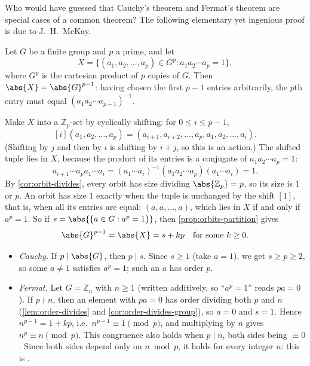 \begin{eg}\label{eg:mckay}
	Who would have guessed that Cauchy's theorem and Fermat's theorem are special cases of
	a common theorem? The following elementary yet ingenious proof is due to J.~H.~McKay.

	Let \(G\) be a finite group and \(p\) a prime, and let
	\[
		X = \{(a_1, a_2, \dots, a_p) \in G^p : a_1a_2\cdots a_p = 1\},
	\]
	where \(G^p\) is the cartesian product of \(p\) copies of \(G\). Then
	\(\abs{X} = \abs{G}^{p-1}\): having chosen the first \(p-1\) entries arbitrarily, the
	\(p\)th entry must equal \((a_1a_2\cdots a_{p-1})^{-1}\).

	Make \(X\) into a \(\mathbb Z_p\)-set by cyclically shifting: for
	\(0 \leq i \leq p-1\),
	\[
		[i](a_1, a_2, \dots, a_p) = (a_{i+1}, a_{i+2}, \dots, a_p, a_1, a_2, \dots, a_i).
	\]
	(Shifting by \(j\) and then by \(i\) is shifting by \(i+j\), so this is an action.)
	The shifted tuple lies in \(X\), because the product of its entries is a conjugate of
	\(a_1a_2\cdots a_p = 1\):
	\[
		a_{i+1}\cdots a_pa_1\cdots a_i
		= (a_1\cdots a_i)^{-1}(a_1a_2\cdots a_p)(a_1\cdots a_i) = 1.
	\]
	By \autoref{cor:orbit-divides}, every orbit has size dividing
	\(\abs{\mathbb Z_p} = p\), so its size is \(1\) or \(p\). An orbit has size \(1\)
	exactly when the tuple is unchanged by the shift \([1]\), that is, when all its entries
	are equal: \((a, a, \dots, a)\), which lies in \(X\) if and only if \(a^p = 1\). So if
	\(s = \abs{\{a \in G : a^p = 1\}}\), then \autoref{prop:orbits-partition} gives
	\[
		\abs{G}^{p-1} = \abs{X} = s + kp \quad\text{for some } k \geq 0.
	\]
	\begin{itemize}
		\item \emph{Cauchy.} If \(p \mid \abs{G}\), then \(p \mid s\). Since \(s \geq 1\)
		      (take \(a = 1\)), we get \(s \geq p \geq 2\), so some \(a \neq 1\) satisfies
		      \(a^p = 1\); such an \(a\) has order \(p\).
		\item \emph{Fermat.} Let \(G = \mathbb Z_n\) with \(n \geq 1\) (written
		      additively, so ``\(a^p = 1\)'' reads \(pa = 0\)). If \(p \nmid n\), then an
		      element with \(pa = 0\) has order dividing both \(p\) and \(n\)
		      (\autoref{lem:order-divides} and \autoref{cor:order-divides-group}), so
		      \(a = 0\) and \(s = 1\). Hence \(n^{p-1} = 1 + kp\), i.e.\
		      \(n^{p-1} \equiv 1 \pmod p\), and multiplying by \(n\) gives
		      \(n^p \equiv n \pmod p\). This congruence also holds when \(p \mid n\), both
		      sides being \(\equiv 0\). Since both sides depend only on \(n \bmod p\), it
		      holds for every integer \(n\): this is \vocab{Fermat's theorem}.
	\end{itemize}
\end{eg}

